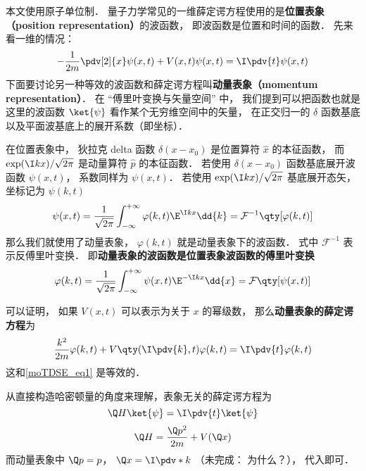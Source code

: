 

本文使用原子单位制． 量子力学常见的一维薛定谔方程使用的是\textbf{位置表象（position representation）}的波函数， 即波函数是位置和时间的函数． 先来看一维的情况：
\begin{equation}\label{moTDSE_eq1}
-\frac{1}{2m} \pdv[2]{x}\psi(x, t) + V(x,t)\psi(x,t) = \I \pdv{t} \psi(x,t)
\end{equation}
下面要讨论另一种等效的波函数和薛定谔方程叫\textbf{动量表象（momentum representation）}． 在 “傅里叶变换与矢量空间” 中， 我们提到可以把函数也就是这里的波函数 $\ket{\psi}$ 看作某个无穷维空间中的矢量， 在正交归一的 $\delta$ 函数基底以及平面波基底上的展开系数（即坐标）．

在位置表象中， 狄拉克 delta 函数 $\delta(x-x_0)$ 是位置算符 $\hat x$ 的本征函数， 而 $\exp(\I kx)/\sqrt{2\pi}$ 是动量算符 $\hat p$ 的本征函数． 若使用 $\delta(x-x_0)$ 函数基底展开波函数 $\psi(x, t)$， 系数同样为 $\psi(x, t)$． 若使用 $\exp(\I kx)/\sqrt{2\pi}$ 基底展开态矢， 坐标记为 $\psi(k, t)$
\begin{equation}\label{moTDSE_eq2}
\psi(x,t) = \frac{1}{\sqrt{2\pi}}\int_{-\infty}^{+\infty} \varphi(k,t)\E^{\I kx}\dd{k} = \mathcal{F}^{-1} \qty[\varphi(k,t)]
\end{equation}
那么我们就使用了动量表象， $\varphi(k, t)$ 就是动量表象下的波函数． 式中 $\mathcal{F}^{-1}$ 表示反傅里叶变换． 即\textbf{动量表象的波函数是位置表象波函数的傅里叶变换}
\begin{equation}
\varphi(k,t) = \frac{1}{\sqrt{2\pi}}\int_{-\infty}^{+\infty} \psi(x,t)\E^{-\I kx}\dd{x} = \mathcal{F}\qty[\psi(x, t)]
\end{equation}

可以证明， 如果 $V(x,t)$ 可以表示为关于 $x$ 的幂级数， 那么\textbf{动量表象的薛定谔方程}为
\begin{equation}\label{moTDSE_eq3}
\frac{k^2}{2m}\varphi(k, t) + V\qty(\I \pdv{k}, t)\varphi(k, t) = \I \pdv{t} \varphi(k,t)
\end{equation}
这和\autoref{moTDSE_eq1} 是等效的．

从直接构造哈密顿量的角度来理解，表象无关的薛定谔方程为
\begin{equation}
\Q H\ket{\psi} = \I \pdv{t}\ket{\psi}
\end{equation}
\begin{equation}
\Q H = \frac{\Q p^2}{2m} + V(\Q x)
\end{equation}
而动量表象中 $\Q p = p$， $\Q x  = \I \pdv*{k}$ （未完成： 为什么？）， 代入即可．

